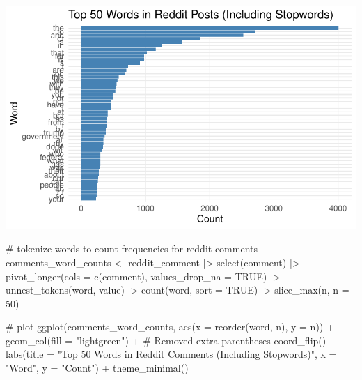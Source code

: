 \documentclass[
  letterpaper,
  DIV=11,
  numbers=noendperiod]{scrartcl}
\newenvironment{Shaded}{\begin{snugshade}}{\end{snugshade}}
\newcommand{\AttributeTok}[1]{\textcolor[rgb]{0.40,0.45,0.13}{#1}}
\newcommand{\CommentTok}[1]{\textcolor[rgb]{0.37,0.37,0.37}{#1}}
\newcommand{\ConstantTok}[1]{\textcolor[rgb]{0.56,0.35,0.01}{#1}}
\newcommand{\DecValTok}[1]{\textcolor[rgb]{0.68,0.00,0.00}{#1}}
\newcommand{\FunctionTok}[1]{\textcolor[rgb]{0.28,0.35,0.67}{#1}}
\newcommand{\NormalTok}[1]{\textcolor[rgb]{0.00,0.23,0.31}{#1}}
\newcommand{\OtherTok}[1]{\textcolor[rgb]{0.00,0.23,0.31}{#1}}
\newcommand{\SpecialCharTok}[1]{\textcolor[rgb]{0.37,0.37,0.37}{#1}}
\newcommand{\StringTok}[1]{\textcolor[rgb]{0.13,0.47,0.30}{#1}}
\begin{document}
\includegraphics{Reddit_eda_files/figure-pdf/unnamed-chunk-6-1.pdf}

\begin{Shaded}
\begin{Highlighting}[]
\CommentTok{\# tokenize words to count frequencies for reddit comments}
\NormalTok{comments\_word\_counts }\OtherTok{\textless{}{-}}\NormalTok{ reddit\_comment }\SpecialCharTok{|\textgreater{}}
  \FunctionTok{select}\NormalTok{(comment) }\SpecialCharTok{|\textgreater{}}
  \FunctionTok{pivot\_longer}\NormalTok{(}\AttributeTok{cols =} \FunctionTok{c}\NormalTok{(comment), }\AttributeTok{values\_drop\_na =} \ConstantTok{TRUE}\NormalTok{) }\SpecialCharTok{|\textgreater{}}
  \FunctionTok{unnest\_tokens}\NormalTok{(word, value) }\SpecialCharTok{|\textgreater{}}
  \FunctionTok{count}\NormalTok{(word, }\AttributeTok{sort =} \ConstantTok{TRUE}\NormalTok{) }\SpecialCharTok{|\textgreater{}}
  \FunctionTok{slice\_max}\NormalTok{(n, }\AttributeTok{n =} \DecValTok{50}\NormalTok{)}

\CommentTok{\# plot}
\FunctionTok{ggplot}\NormalTok{(comments\_word\_counts, }\FunctionTok{aes}\NormalTok{(}\AttributeTok{x =} \FunctionTok{reorder}\NormalTok{(word, n), }\AttributeTok{y =}\NormalTok{ n)) }\SpecialCharTok{+}
  \FunctionTok{geom\_col}\NormalTok{(}\AttributeTok{fill =} \StringTok{"lightgreen"}\NormalTok{) }\SpecialCharTok{+}  \CommentTok{\# Removed extra parentheses}
  \FunctionTok{coord\_flip}\NormalTok{() }\SpecialCharTok{+}
  \FunctionTok{labs}\NormalTok{(}\AttributeTok{title =} \StringTok{"Top 50 Words in Reddit Comments (Including Stopwords)"}\NormalTok{,}
       \AttributeTok{x =} \StringTok{"Word"}\NormalTok{,}
       \AttributeTok{y =} \StringTok{"Count"}\NormalTok{) }\SpecialCharTok{+}
  \FunctionTok{theme\_minimal}\NormalTok{()}
\end{Highlighting}
\end{Shaded}
\end{document}
